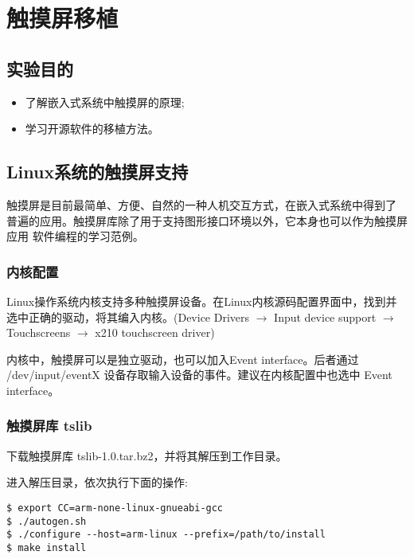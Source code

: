 \chapter{触摸屏移植}\label{ch-ts}

\section{实验目的}
\begin{itemize}\itemsep=-3pt
  \item 了解嵌入式系统中触摸屏的原理;
  \item 学习开源软件的移植方法。
\end{itemize}

\section{Linux系统的触摸屏支持}
	触摸屏是目前最简单、方便、自然的一种人机交互方式，在嵌入式系统中得到了
普遍的应用。触摸屏库除了用于支持图形接口环境以外，它本身也可以作为触摸屏应用
软件编程的学习范例。

\subsection{内核配置}
	Linux操作系统内核支持多种触摸屏设备。在Linux内核源码配置界面中，找到并
选中正确的驱动，将其编入内核。(Device Drivers $\to$ Input device support
$\to$ Touchscreens $\to$ x210 touchscreen driver)

	内核中，触摸屏可以是独立驱动，也可以加入Event interface。后者通过
 /dev/input/eventX 设备存取输入设备的事件。建议在内核配置中也选中
 Event interface。

\subsection{触摸屏库 tslib}
	下载触摸屏库 tslib-1.0.tar.bz2，并将其解压到工作目录。

	进入解压目录，依次执行下面的操作:

\begin{boxedminipage}{.9\textwidth}
\begin{verbatim}
$ export CC=arm-none-linux-gnueabi-gcc
$ ./autogen.sh
$ ./configure --host=arm-linux --prefix=/path/to/install
$ make install
\end{verbatim}
\end{boxedminipage}

